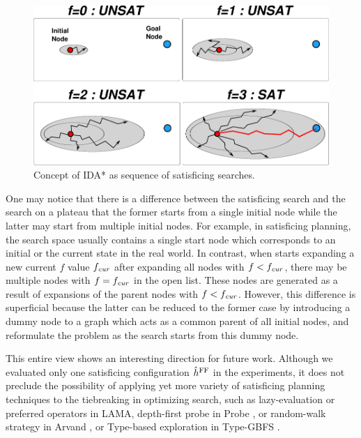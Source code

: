 \begin{figure}[htbp]
 \includegraphics{img/astar/plateau-6.pdf}
 \caption{Concept of IDA* as sequence of satisficing searches.}
\end{figure}

One may notice that there is a difference between the satisficing search and the search on a plateau that
the former starts from a single initial node while the latter may start from multiple initial nodes.
For example, in satisficing planning, the search space usually contains a single start node which corresponds to an initial or the current state in the real world.
% 
In contrast, when \astar starts expanding a new current $f$ value $f_{\mit{cur}}$ after expanding all nodes with $f<f_\mit{cur}$,
there may be multiple nodes with $f=f_\mit{cur}$ in the open list.
These nodes are generated as a result of expansions of the parent nodes with $f<f_\mit{cur}$.
% 
However, this difference is superficial because the latter can be reduced to the former case by introducing a dummy
node to a graph which acts as a common parent of all initial nodes, and reformulate the problem as the search
starts from this dummy node.

This entire view shows an interesting direction for future work.
Although we evaluated only one \sota satisficing configuration $\ffo$ in
the experiments, it does not preclude the possibility of applying yet
more variety of satisficing planning techniques to the tiebreaking in optimizing search, such as lazy-evaluation
or preferred operators in LAMA, depth-first probe in Probe \cite{LipovetzkyG11}, or
random-walk strategy in Arvand \cite{nakhost2009monte}, or Type-based
exploration in Type-GBFS \cite{xie14type}.

